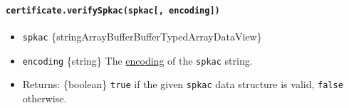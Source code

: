 \begin{Shaded}
\begin{Highlighting}[]
\OperatorTok{=} \NormalTok{(}\NormalTok{)}\OperatorTok{;}
\OperatorTok{=} \NormalTok{()}\OperatorTok{;}
\OperatorTok{=} \NormalTok{()}\OperatorTok{;}
\OperatorTok{=}\OperatorTok{;}
\OperatorTok{;}
\end{Highlighting}
\end{Shaded}

\paragraph{\texorpdfstring{\texttt{certificate.verifySpkac(spkac{[},\ encoding{]})}}{certificate.verifySpkac(spkac{[}, encoding{]})}}\label{certificate.verifyspkacspkac-encoding}

\begin{itemize}
\tightlist
\item
  \texttt{spkac}
  \{string\textbar ArrayBuffer\textbar Buffer\textbar TypedArray\textbar DataView\}
\item
  \texttt{encoding} \{string\} The
  \href{buffer.md\#buffers-and-character-encodings}{encoding} of the
  \texttt{spkac} string.
\item
  Returns: \{boolean\} \texttt{true} if the given \texttt{spkac} data
  structure is valid, \texttt{false} otherwise.
\end{itemize}

\begin{Shaded}
\begin{Highlighting}[]
\NormalTok{ \{ }\NormalTok{ \} } \OperatorTok{;}
\OperatorTok{=}  \NormalTok{(}\NormalTok{)}\OperatorTok{;}

\OperatorTok{=} \NormalTok{()}\OperatorTok{;}
\OperatorTok{=} \NormalTok{()}\OperatorTok{;}
\NormalTok{(}\OperatorTok{;}
\end{Highlighting}
\end{Shaded}

